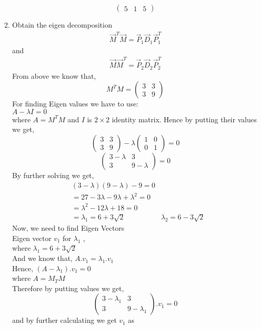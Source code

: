 \documentclass[journal,12pt,twocolumn]{IEEEtran}
\renewcommand\thesection{\arabic{section}}
\begin{document}
\begin{enumerate}[label=\thesection.\arabic*.,ref=\thesection.\theenumi]
$$\begin{pmatrix}
5 & 1 & 5
\end{pmatrix}
$$
\item Obtain the eigen decomposition 
\begin{align}
\vec{M}^T\vec{M} = \vec{P}_1\vec{D}_1\vec{P}_1^T
\end{align}
and 
\begin{align}
\vec{M}\vec{M}^T = \vec{P}_2\vec{D}_2\vec{P}_2^T
\end{align}
\solution
From above we know that,
$$
M^TM=\begin{pmatrix}
3 & 3\\
3 & 9
\end{pmatrix}
$$
For finding Eigen values we have to use:\\
$A-\lambda I=0$\\
where $A=M^TM$ and $I$ is $2\times 2$ identity matrix.
Hence by putting their values we get,
$$
\begin{pmatrix}
3 & 3\\
3 & 9
\end{pmatrix}
-\lambda
\begin{pmatrix}
1 & 0\\
0 & 1
\end{pmatrix}
=0
$$
$$
\begin{pmatrix}
3-\lambda & 3\\
3 & 9-\lambda
\end{pmatrix}
=0
$$
By further solving we get,
\begin{align*}
& (3-\lambda)(9-\lambda)-9=0\\
& =27-3\lambda-9\lambda+\lambda^2=0\\
& =\lambda^2-12\lambda+18=0\\
& =\lambda_1=6+3\sqrt{2} & \lambda_2=6-3\sqrt{2}
\end{align*}
Now, we need to find Eigen Vectors\\
Eigen vector $v_1$ for $\lambda_1$ ,\\
where $\lambda_1 =6+3\sqrt{2}$\\
And we know that,
$A.v_1 = \lambda_1.v_1$\\
Hence, $(A-\lambda_1).v_1=0$\\
where $A=M_TM $\\
Therefore by putting values we get,\\
$$
\begin{pmatrix}
3-\lambda_1 & 3\\
3 & 9-\lambda_1
\end{pmatrix}
.v_1=0
$$
and by further calculating we get $v_1$ as\\

\end{enumerate}
\end{document}
